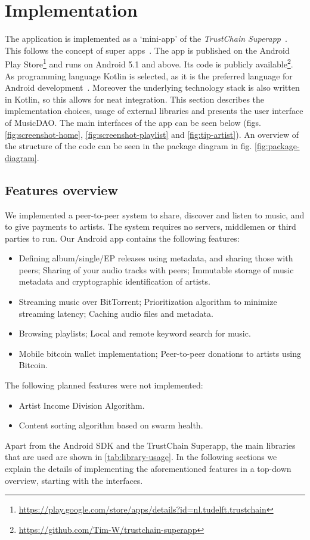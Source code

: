 \chapter{Implementation}
The application is implemented as a `mini-app' of the \textit{TrustChain Superapp}~\citep{mattskala2020}. This follows the concept of super apps~\citep{kpmg2019superapps}. The app is published on the Android Play Store\footnote{\url{https://play.google.com/store/apps/details?id=nl.tudelft.trustchain}} and runs on Android 5.1 and above. Its code is publicly available\footnote{\url{https://github.com/Tim-W/trustchain-superapp}}. As programming language Kotlin is selected, as it is the preferred language for Android development~\citep{googleio2019}. Moreover the underlying technology stack is also written in Kotlin, so this allows for neat integration. This section describes the implementation choices, usage of external libraries and presents the user interface of MusicDAO. The main interfaces of the app can be seen below (figs. \ref{fig:screenshot-home}, \ref{fig:screenshot-playlist} and \ref{fig:tip-artist}). An overview of the structure of the code can be seen in the package diagram in fig. \ref{fig:package-diagram}.

\section{Features overview}
We implemented a peer-to-peer system to share, discover and listen to music, and to give payments to artists. The system requires no servers, middlemen or third parties to run. Our Android app contains the following features:
\begin{itemize}
    \item Defining album/single/EP releases using metadata, and sharing those with peers; Sharing of your audio tracks with peers; Immutable storage of music metadata and cryptographic identification of artists.
    \item Streaming music over BitTorrent; Prioritization algorithm to minimize streaming latency; Caching audio files and metadata.
    \item Browsing playlists; Local and remote keyword search for music.
    \item Mobile bitcoin wallet implementation; Peer-to-peer donations to artists using Bitcoin.
\end{itemize}
The following planned features were not implemented:
\begin{itemize}
    \item Artist Income Division Algorithm.
    \item Content sorting algorithm based on swarm health.
\end{itemize}
Apart from the Android SDK and the TrustChain Superapp, the main libraries that are used are shown in \ref{tab:library-usage}. In the following sections we explain the details of implementing the aforementioned features in a top-down overview, starting with the interfaces.

